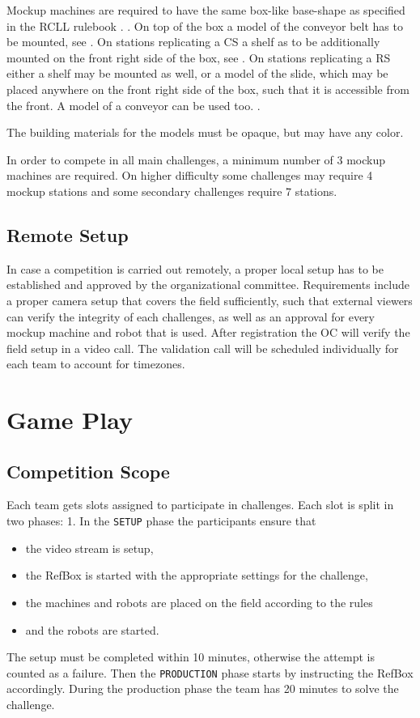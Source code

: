\documentclass[12pt,twoside]{article}
\begin{document}
Mockup machines are required to have the same box-like base-shape as specified
in the RCLL rulebook .
.
On top of the box a model of the conveyor belt has to be mounted, see
.
On stations replicating a \ac{CS} a shelf as to be additionally mounted on the
front right side of the box, see
.
On stations replicating a \ac{RS} either a shelf may be mounted as well,
or a model of the slide, which may be placed anywhere on the front right side
of the box, such that it is accessible from the front.
A model of a conveyor can be used too.
.

The building materials for the models must be opaque, but may have any color.

In order to compete in all main challenges, a minimum number of 3 mockup
machines are required. On higher difficulty some challenges may require
4 mockup stations and some secondary challenges require 7 stations.

\subsection{Remote Setup}
In case a competition is carried out remotely, a proper local setup has to
be established and approved by the organizational committee.
Requirements include a proper camera setup that covers the field sufficiently,
such that external viewers can verify the integrity of each challenges,
as well as an approval for every mockup machine and robot that is used.
After registration the OC will verify the field setup in a video call.
The validation call will be scheduled individually for each team
to account for timezones.

\section{Game Play}
\subsection{Competition Scope}
Each team gets slots assigned to participate in challenges.
Each slot is split in two phases:
1. In the \texttt{SETUP} phase the participants ensure that
\begin{itemize}
	\item the video stream is setup,
	\item the RefBox is started with the appropriate settings for the challenge,
	\item the machines and robots are placed on the field according to the rules
	\item and the robots are started.
\end{itemize}
The setup must be completed within 10 minutes, otherwise the attempt is counted
as a failure.
Then the \texttt{PRODUCTION} phase starts by instructing the RefBox accordingly.
During the production phase the team has 20 minutes to solve the challenge.
\end{document}
